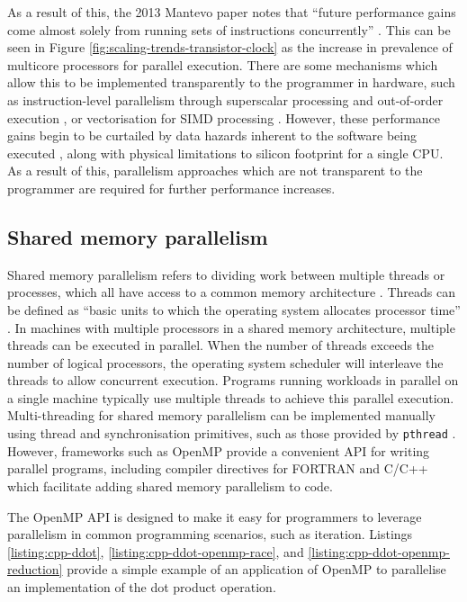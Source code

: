 As a result of this, the 2013 Mantevo paper notes that ``future performance gains come almost solely from running sets of instructions concurrently'' \cite{heroux2013mantevo}. This can be seen in Figure \ref{fig:scaling-trends-transistor-clock} as the increase in prevalence of multicore processors for parallel execution. There are some mechanisms which allow this to be implemented transparently to the programmer in hardware, such as instruction-level parallelism through superscalar processing and out-of-order execution \cite{pattersonHennessyComputerOrganisationArchitecture}, or vectorisation for SIMD processing \cite{pattersonHennessyComputerOrganisationArchitecture}. However, these performance gains begin to be curtailed by data hazards inherent to the software being executed \cite{shahhoseini1999achieving}, along with physical limitations to silicon footprint for a single CPU. As a result of this, parallelism approaches which are not transparent to the programmer are required for further performance increases.

\subsection{Shared memory parallelism}
\label{ssec:shared-memory-paralellism}

Shared memory parallelism refers to dividing work between multiple threads or processes, which all have access to a common memory architecture \cite{SharedMemoryParallelism}. Threads can be defined as ``basic units to which the operating system allocates processor time'' \cite{karl-bridge-microsoftProcessesThreadsWin322021}. In machines with multiple processors in a shared memory architecture, multiple threads can be executed in parallel. When the number of threads exceeds the number of logical processors, the operating system scheduler will interleave the threads to allow concurrent execution. Programs running workloads in parallel on a single machine typically use multiple threads to achieve this parallel execution. Multi-threading for shared memory parallelism can be implemented manually using thread and synchronisation primitives, such as those provided by \texttt{pthread} \cite{nichols1996pthreads}. However, frameworks such as OpenMP \cite{dagumOpenMPIndustryStandard1998} provide a convenient API for writing parallel programs, including compiler directives for FORTRAN and C/C++ which facilitate adding shared memory parallelism to code.

The OpenMP API is designed to make it easy for programmers to leverage parallelism in common programming scenarios, such as iteration. Listings \ref{listing:cpp-ddot}, \ref{listing:cpp-ddot-openmp-race}, and \ref{listing:cpp-ddot-openmp-reduction} provide a simple example of an application of OpenMP to parallelise an implementation of the dot product operation.

